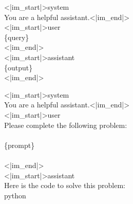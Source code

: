 \begin{table}[h]
\centering
\begin{minipage}[t]{0.48\textwidth}
\centering
\caption{Chat template for \alg{} OpenCoder-SFT training.}
\begin{chatbox}
    <|im\_start|>system\\
    You are a helpful assistant.<|im\_end|>\\
    <|im\_start|>user\\
    \{{query}\}\\
    <|im\_end|>\\
    <|im\_start|>assistant\\
    \{output\}\\
    <|im\_end|>
\end{chatbox}
\label{tab:chat-sft}
\end{minipage}
\hfill
\begin{minipage}[t]{0.48\textwidth}
\centering
\caption{Chat template for \alg{} HumanEval evaluation.}
\begin{chatbox}
    <|im\_start|>system\\
    You are a helpful assistant.<|im\_end|>\\
    <|im\_start|>user\\
    Please complete the following problem:\\
    \textasciigrave\textasciigrave\textasciigrave\\
    \{prompt\}\\
    \textasciigrave\textasciigrave\textasciigrave\\
    <|im\_end|>\\
    <|im\_start|>assistant\\
    Here is the code to solve this problem:\\
    \textasciigrave\textasciigrave\textasciigrave python
\end{chatbox}
\label{tab:chat-humaneval}
\end{minipage}

\vspace{0.8em}


\end{table}
